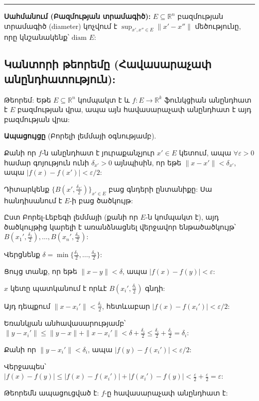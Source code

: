 \documentclass[12pt, a4paper]{article}
\begin{document}
\tableofcontents
\vspace{2em}
\hrule
\vspace{2em}

\textbf{Սահմանում (Բազմության տրամագիծ):}
$E \subseteq \mathbb{R}^n$ բազմության տրամագիծ (diameter) կոչվում է $\sup_{x', x'' \in E} \|x' - x''\|$ մեծությունը, որը կնշանակենք՝ $\text{diam } E$:

\subsection{Կանտորի թեորեմը (Հավասարաչափ անընդհատություն):}

Թեորեմ: Եթե $E \subseteq \mathbb{R}^n$ կոմպակտ է և $f: E \to \mathbb{R}^k$ ֆունկցիան անընդհատ է $E$ բազմության վրա, ապա այն հավասարաչափ անընդհատ է այդ բազմության վրա:

\textbf{Ապացույցը} (Բորելի լեմմայի օգնությամբ).

Քանի որ $f$-ն անընդհատ է յուրաքանչյուր $x' \in E$ կետում, ապա $\forall \varepsilon > 0$ համար գոյություն ունի $\delta_{x'} > 0$ այնպիսին, որ եթե $\|x - x'\| < \delta_{x'}$, ապա $|f(x) - f(x')| < \varepsilon/2$:

Դիտարկենք $\{B(x', \frac{\delta_{x'}}{2})\}_{x' \in E}$ բաց գնդերի ընտանիքը: Սա հանդիսանում է $E$-ի բաց ծածկույթ:

Ըստ Բորել-Լեբեգի լեմմայի (քանի որ $E$-ն կոմպակտ է), այդ ծածկույթից կարելի է առանձնացնել վերջավոր ենթածածկույթ՝ $B(x_1', \frac{\delta_1}{2}), \dots, B(x_n', \frac{\delta_n}{2})$:

Վերցնենք $\delta = \min \{ \frac{\delta_1}{2}, \dots, \frac{\delta_n}{2} \}$:

Ցույց տանք, որ եթե $\|x - y\| < \delta$, ապա $|f(x) - f(y)| < \varepsilon$:

$x$ կետը պատկանում է որևէ $B(x_i', \frac{\delta_i}{2})$ գնդի:

Այդ դեպքում $\|x - x_i'\| < \frac{\delta_i}{2}$, հետևաբար $|f(x) - f(x_i')| < \varepsilon/2$:

Եռանկյան անհավասարությամբ՝ $\|y - x_i'\| \le \|y - x\| + \|x - x_i'\| < \delta + \frac{\delta_i}{2} \le \frac{\delta_i}{2} + \frac{\delta_i}{2} = \delta_i$:

Քանի որ $\|y - x_i'\| < \delta_i$, ապա $|f(y) - f(x_i')| < \varepsilon/2$:

Վերջապես՝ $|f(x) - f(y)| \le |f(x) - f(x_i')| + |f(x_i') - f(y)| < \frac{\varepsilon}{2} + \frac{\varepsilon}{2} = \varepsilon$:

Թեորեմն ապացուցված է: $f$-ը հավասարաչափ անընդհատ է:
\end{document}
